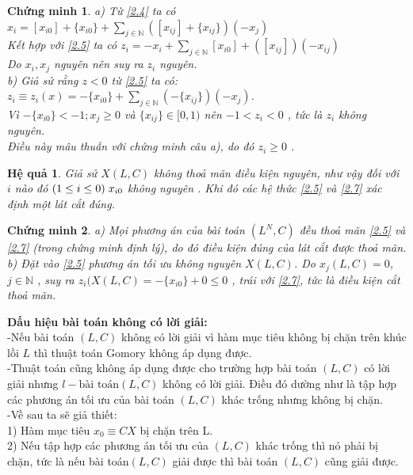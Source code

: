 \documentclass[12pt,a4paper]{report}
\newtheorem{hq}{Hệ quả}
\newtheorem{cm}{Chứng minh}
\begin{document}
        \begin{cm}
            a) Từ \eqref{2.4} ta có $x_i= [x_{i0}] + \{x_{i0}\}+\underset{j \in \mathbb {N} }{ \sum}([x_{ij}]+\{x_{ij}\})(-x_{j}) $\\
    Kết hợp với \eqref{2.5} ta có $z_i= -x_i +      \underset{j \in \mathbb {N} }{ \sum}[x_{i0}] + ([x_{ij}])(-x_{ij}) $\\
    Do $x_i,x_j$ nguyên nên suy ra $z_i$ nguyên.\\
    \vspace{1cm}
    b) Giả sử rằng $z< 0$ từ \eqref{2.5} ta có:\\
    $z_i \equiv z_i (x)= -\{x_{i0}\} + \underset{j \in \mathbb {N} }{ \sum}(-\{x_{ij}\})(-x_{j})$.\\
    Vì $ {-}\{x_{i0}\}<-1 ; x_j \ge 0  $ và  $ \{x_{ij}\} \in  [0,1)$  nên $ -1<z_i<0$ , tức là $z_i$ không nguyên.\\
Điều này mâu thuẫn với chứng minh câu a), do đó $z_i \ge 0$ .
        \end{cm}
    \begin{hq}
        Giả sử $X(L,C)$ không thoả mãn điều kiện nguyên, như vậy đối 
với $i$ nào đó $(1\le i \le 0) \hspace{0.1cm} x_{i0}$ không nguyên . Khi đó các hệ thức \eqref{2.5}  và \eqref{2.7} xác định một lát cắt đúng.
    \end{hq} 
    \begin{cm}
         a) Mọi phương án của bài toán $(L^N,C)$ đều thoả mãn \eqref{2.5} và \eqref{2.7} (trong chứng 
minh định lý), do đó điều kiện đúng của lát cắt được thoả mãn. \\
b) Đặt vào \eqref{2.5} phương án tối ưu không nguyên $X(L,C)$. Do $x_j (L,C)=0$, $j \in \mathbb {N}$ , 
suy ra $z_i(X(L,C)= -\{ x_{i0}\} +0 \le 0 $ , trái với \eqref{2.7}, tức là điều kiện cắt thoả mãn.\\
    \end{cm}
    \textbf{Dấu hiệu bài toán không có lời giải:}\\
    -Nếu bài toán $(L,C)$ không có lời giải vì hàm mục tiêu không bị chặn trên khúc lồi $L$ thì thuật toán Gomory không áp dụng được.\\
-Thuật toán cũng không áp dụng được cho trường hợp bài toán $(L,C)$ có lời giải nhưng $l-\text{bài toán} \overline{(L,C)}$ không có lời giải. Điều đó dường như là tập hợp các phương án tối ưu của bài toán $(L,C)$ khác trống nhưng không bị chặn.\\
-Về sau ta sẽ giả thiết:\\
1) Hàm mục tiêu $x_0\equiv CX$ bị chặn trên L.\\
2) Nếu tập hợp các phương án tối ưu của $(L,C)$ khác trống thì nó phải bị chặn, tức là nếu bài toán$(L,C)$ giải được thì bài toán $(L,C)$ cũng giải 
được.\\
\end{document}
